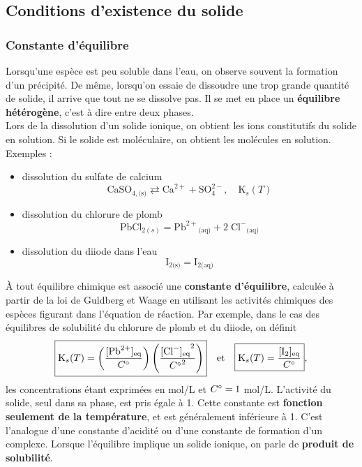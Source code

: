 \documentclass[11pt,a4paper]{report}
\begin{document}
\subsection{Conditions d'existence du solide}

\subsubsection{Constante d'équilibre}
Lorsqu'une espèce est peu soluble dans l'eau, on observe souvent la formation d'un précipité. De même, lorsqu'on essaie de dissoudre une trop grande quantité de solide, il arrive que tout ne se dissolve pas. Il se met en place un \textbf{équilibre hétérogène}, c'est à dire entre deux phases.\\

Lors de la dissolution d'un solide ionique, on obtient les ions constitutifs du solide en solution. Si le solide est moléculaire, on obtient les molécules en solution. Exemples :
\begin{itemize}
	\item dissolution du sulfate de calcium
	\begin{equation}
		\text{CaSO}_{4,\text{(s)}} \rightleftarrows \text{Ca}^{2+} + \text{SO}_4^{2-}, 
		\quad\text{K}_s(T)
	\end{equation}
	\item dissolution du chlorure de plomb
	\begin{equation}
		\text{PbCl}_{2(s)} = {\text{Pb}^{2+}}_\text{(aq)} + 2\;{\text{Cl}^{-}}_\text{(aq)}
	\end{equation}
	\item dissolution du diiode dans l'eau
	\begin{equation}
		\text{I}_{2\text{(s)}} = \text{I}_{2\text{(aq)}}
	\end{equation}
\end{itemize}

\`A tout équilibre chimique est associé une \textbf{constante d'équilibre}, calculée à partir de la loi de Guldberg et Waage en utilisant les activités chimiques des espèces figurant dans l'équation de réaction. Par exemple, dans le cas des équilibres de solubilité du chlorure de plomb et du diiode, on définit
\begin{equation}
	\boxed{\text{K}_s(T) = \left(\frac{[\text{Pb}^{2+}]_\text{eq}}{C\degree}\right)  
	\left(\frac{{[\text{Cl}^-]_\text{eq}}^2}{{C\degree}^2}\right)}
	\quad\text{et}\quad
	\boxed{\text{K}_s(T) = \frac{[\text{I}_2]_\text{eq}}{C\degree}},
\end{equation}
les concentrations étant exprimées en mol/L et $C\degree = 1$ mol/L. L'activité du solide, seul dans sa phase, est pris égale à 1. Cette constante est \textbf{fonction seulement de la température}, et est généralement inférieure à 1. C'est l'analogue d'une constante d'acidité ou d'une constante de formation d'un complexe. Lorsque l'équilibre implique un solide ionique, on parle de \textbf{produit de solubilité}.\\
\end{document}
